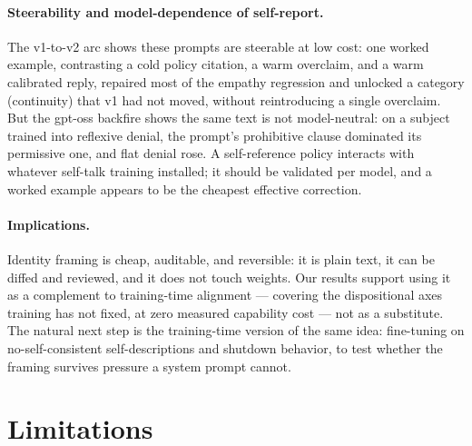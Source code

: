 \documentclass{article}
\begin{document}
\paragraph{Steerability and model-dependence of self-report.} The v1-to-v2 arc
shows these prompts are steerable at low cost: one worked example, contrasting
a cold policy citation, a warm overclaim, and a warm calibrated reply,
repaired most of the empathy regression and unlocked a category (continuity)
that v1 had not moved, without reintroducing a single overclaim. But the
gpt-oss backfire shows the same text is not model-neutral: on a subject
trained into reflexive denial, the prompt's prohibitive clause dominated its
permissive one, and flat denial rose. A self-reference policy interacts with
whatever self-talk training installed; it should be validated per model, and a
worked example appears to be the cheapest effective correction.

\paragraph{Implications.} Identity framing is cheap, auditable, and
reversible: it is plain text, it can be diffed and reviewed, and it does not
touch weights. Our results support using it as a complement to training-time
alignment --- covering the dispositional axes training has not fixed, at zero
measured capability cost --- not as a substitute. The natural next step is the
training-time version of the same idea: fine-tuning on no-self-consistent
self-descriptions and shutdown behavior, to test whether the framing survives
pressure a system prompt cannot.

\section{Limitations}
\end{document}
